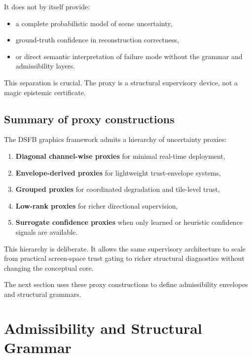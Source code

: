 \documentclass[11pt]{article}
\theoremstyle{definition}
\theoremstyle{plain}
\begin{document}
It does not by itself provide:
\begin{itemize}[leftmargin=1.5em]
    \item a complete probabilistic model of scene uncertainty,
    \item ground-truth confidence in reconstruction correctness,
    \item or direct semantic interpretation of failure mode without the grammar and admissibility layers.
\end{itemize}

This separation is crucial. The proxy is a structural supervisory device, not a magic epistemic certificate.


\subsection{Summary of proxy constructions}

The DSFB graphics framework admits a hierarchy of uncertainty proxies:
\begin{enumerate}[leftmargin=1.5em]
    \item \textbf{Diagonal channel-wise proxies} for minimal real-time deployment,
    \item \textbf{Envelope-derived proxies} for lightweight trust-envelope systems,
    \item \textbf{Grouped proxies} for coordinated degradation and tile-level trust,
    \item \textbf{Low-rank proxies} for richer directional supervision,
    \item \textbf{Surrogate confidence proxies} when only learned or heuristic confidence signals are available.
\end{enumerate}

This hierarchy is deliberate. It allows the same supervisory architecture to scale from practical screen-space trust gating to richer structural diagnostics without changing the conceptual core.

The next section uses these proxy constructions to define admissibility envelopes and structural grammars.

\section{Admissibility and Structural Grammar}
\label{sec:admissibility}
\end{document}
